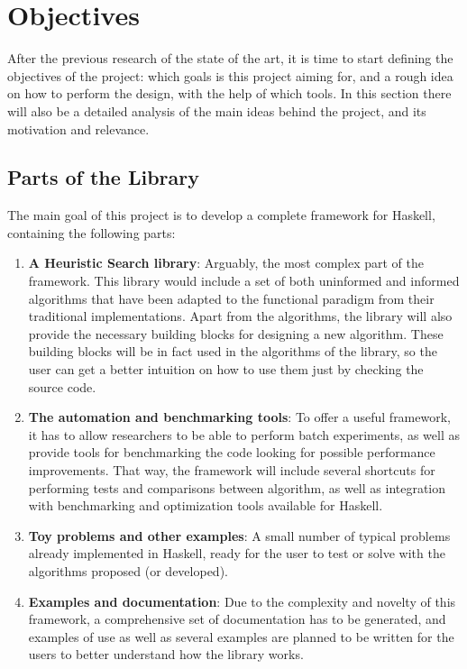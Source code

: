 \section{Objectives}

After the previous research of the state of the art, it is time to start
defining the objectives of the project: which goals is this project aiming for,
and a rough idea on how to perform the design, with the help of which tools. In
this section there will also be a detailed analysis of the main ideas behind
the project, and its motivation and relevance.\\

\subsection{Parts of the Library}

The main goal of this project is to develop a complete framework for Haskell,
containing the following parts:

\begin{enumerate}
\item \textbf{A Heuristic Search library}: Arguably, the most complex part of
  the framework. This library would include a set of both uninformed and
  informed algorithms that have been adapted to the functional paradigm from
  their traditional implementations. Apart from the algorithms, the library
  will also provide the necessary building blocks for designing a new
  algorithm. These building blocks will be in fact used in the algorithms of
  the library, so the user can get a better intuition on how to use them just
  by checking the source code.
\item \textbf{The automation and benchmarking tools}: To offer a useful
  framework, it has to allow researchers to be able to perform batch
  experiments, as well as provide tools for benchmarking the code looking for
  possible performance improvements. That way, the framework will include
  several shortcuts for performing tests and comparisons between algorithm, as
  well as integration with benchmarking and optimization tools available for
  Haskell.
\item \textbf{Toy problems and other examples}: A small number of typical
  problems already implemented in Haskell, ready for the user to test or solve
  with the algorithms proposed (or developed).
\item \textbf{Examples and documentation}: Due to the complexity and novelty of
  this framework, a comprehensive set of documentation has to be generated, and
  examples of use as well as several examples are planned to be written for the
  users to better understand how the library works.
\end{enumerate}

